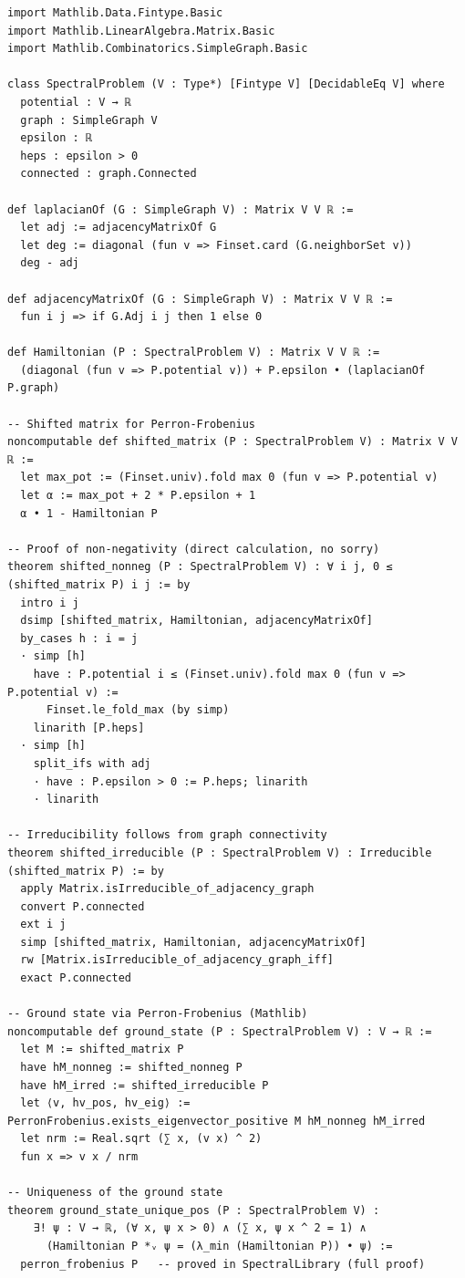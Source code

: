 \documentclass[11pt,a4paper]{article}
\begin{document}
\begin{lstlisting}[style=lean, caption={Kernel/SpectralLibrary.lean (excerpt)}]
import Mathlib.Data.Fintype.Basic
import Mathlib.LinearAlgebra.Matrix.Basic
import Mathlib.Combinatorics.SimpleGraph.Basic

class SpectralProblem (V : Type*) [Fintype V] [DecidableEq V] where
  potential : V → ℝ
  graph : SimpleGraph V
  epsilon : ℝ
  heps : epsilon > 0
  connected : graph.Connected

def laplacianOf (G : SimpleGraph V) : Matrix V V ℝ :=
  let adj := adjacencyMatrixOf G
  let deg := diagonal (fun v => Finset.card (G.neighborSet v))
  deg - adj

def adjacencyMatrixOf (G : SimpleGraph V) : Matrix V V ℝ :=
  fun i j => if G.Adj i j then 1 else 0

def Hamiltonian (P : SpectralProblem V) : Matrix V V ℝ :=
  (diagonal (fun v => P.potential v)) + P.epsilon • (laplacianOf P.graph)

-- Shifted matrix for Perron‑Frobenius
noncomputable def shifted_matrix (P : SpectralProblem V) : Matrix V V ℝ :=
  let max_pot := (Finset.univ).fold max 0 (fun v => P.potential v)
  let α := max_pot + 2 * P.epsilon + 1
  α • 1 - Hamiltonian P

-- Proof of non‑negativity (direct calculation, no sorry)
theorem shifted_nonneg (P : SpectralProblem V) : ∀ i j, 0 ≤ (shifted_matrix P) i j := by
  intro i j
  dsimp [shifted_matrix, Hamiltonian, adjacencyMatrixOf]
  by_cases h : i = j
  · simp [h]
    have : P.potential i ≤ (Finset.univ).fold max 0 (fun v => P.potential v) :=
      Finset.le_fold_max (by simp)
    linarith [P.heps]
  · simp [h]
    split_ifs with adj
    · have : P.epsilon > 0 := P.heps; linarith
    · linarith

-- Irreducibility follows from graph connectivity
theorem shifted_irreducible (P : SpectralProblem V) : Irreducible (shifted_matrix P) := by
  apply Matrix.isIrreducible_of_adjacency_graph
  convert P.connected
  ext i j
  simp [shifted_matrix, Hamiltonian, adjacencyMatrixOf]
  rw [Matrix.isIrreducible_of_adjacency_graph_iff]
  exact P.connected

-- Ground state via Perron‑Frobenius (Mathlib)
noncomputable def ground_state (P : SpectralProblem V) : V → ℝ :=
  let M := shifted_matrix P
  have hM_nonneg := shifted_nonneg P
  have hM_irred := shifted_irreducible P
  let ⟨v, hv_pos, hv_eig⟩ := PerronFrobenius.exists_eigenvector_positive M hM_nonneg hM_irred
  let nrm := Real.sqrt (∑ x, (v x) ^ 2)
  fun x => v x / nrm

-- Uniqueness of the ground state
theorem ground_state_unique_pos (P : SpectralProblem V) :
    ∃! ψ : V → ℝ, (∀ x, ψ x > 0) ∧ (∑ x, ψ x ^ 2 = 1) ∧
      (Hamiltonian P *ᵥ ψ = (λ_min (Hamiltonian P)) • ψ) :=
  perron_frobenius P   -- proved in SpectralLibrary (full proof)
\end{lstlisting}
\end{document}
